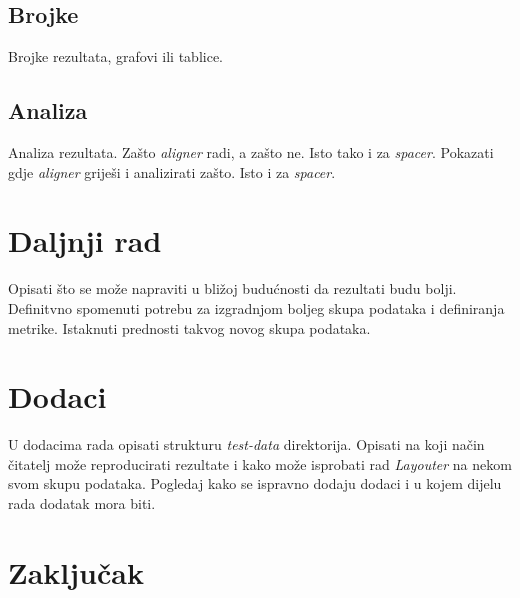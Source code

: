 \documentclass[times, utf8, zavrsni]{fer}
\begin{document}
\section{Brojke}
Brojke rezultata, grafovi ili tablice.

\section{Analiza}
Analiza rezultata. Zašto \emph{aligner} radi, a zašto ne. Isto tako i za
\emph{spacer}. Pokazati gdje \emph{aligner} griješi i analizirati zašto. Isto i za
\emph{spacer}.

\chapter{Daljnji rad}
Opisati što se može napraviti u bližoj budućnosti da rezultati budu bolji.
Definitvno spomenuti potrebu za izgradnjom boljeg skupa podataka i definiranja
metrike. Istaknuti prednosti takvog novog skupa podataka.

\chapter{Dodaci}
U dodacima rada opisati strukturu \emph{test-data} direktorija. Opisati
na koji način čitatelj može reproducirati rezultate i kako može isprobati rad
\emph{Layouter} na nekom svom skupu podataka. Pogledaj kako se ispravno dodaju
dodaci i u kojem dijelu rada dodatak mora biti.

\chapter{Zaključak}




\begin{sazetak}

\kljucnerijeci{}
\end{sazetak}

\begin{abstract}

\keywords{}
\end{abstract}
\end{document}
